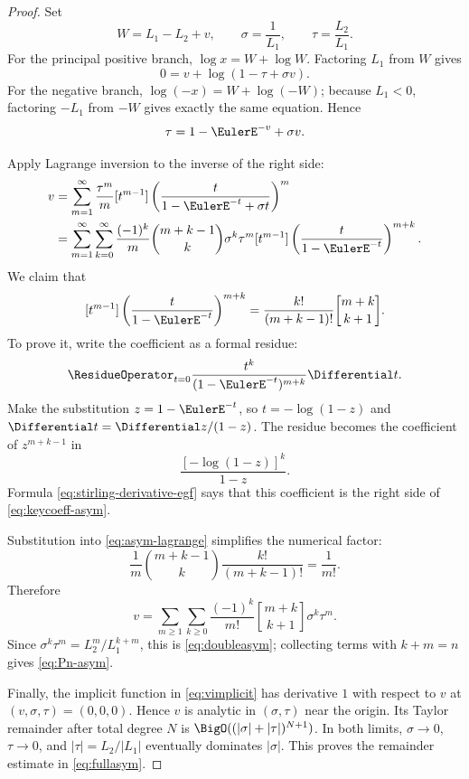 \documentclass[11pt]{article}
\theoremstyle{remark}
\newcommand{\stirling}[2]{\genfrac{[}{]}{0pt}{}{#1}{#2}}
\begin{document}
\begin{proof}
Set
\[
       W=L_1-L_2+v,\qquad
       \sigma=\frac1{L_1},\qquad
       \tau=\frac{L_2}{L_1}.
\]
For the principal positive branch,
\(\log x=W+\log W\).  Factoring \(L_1\) from \(W\) gives
\[
 0=v+\log(1-\tau+\sigma v).
\]
For the negative branch, \(\log(-x)=W+\log(-W)\); because \(L_1<0\),
factoring \(-L_1\) from \(-W\) gives exactly the same equation.  Hence
\begin{equation}\label{eq:vimplicit}
       \tau=1-\EulerE^{-v}+\sigma v.
\end{equation}

Apply Lagrange inversion to the inverse of the right side:
\begin{align}
 v
 &=\sum_{m=1}^{\infty}\frac{\tau^m}{m}
 [t^{m-1}]
 \left(\frac{t}{1-\EulerE^{-t}+\sigma t}\right)^m\notag\\
 &=\sum_{m=1}^{\infty}\sum_{k=0}^{\infty}
 \frac{(-1)^k}{m}
 \binom{m+k-1}{k}\sigma^k\tau^m
 [t^{m-1}]
 \left(\frac{t}{1-\EulerE^{-t}}\right)^{m+k}.
 \label{eq:asym-lagrange}
\end{align}
We claim that
\begin{equation}\label{eq:keycoeff-asym}
 [t^{m-1}]
 \left(\frac{t}{1-\EulerE^{-t}}\right)^{m+k}
 =\frac{k!}{(m+k-1)!}\stirling{m+k}{k+1}.
\end{equation}
To prove it, write the coefficient as a formal residue:
\[
 \ResidueOperator_{t=0}\frac{t^k}{(1-\EulerE^{-t})^{m+k}}\Differential t.
\]
Make the substitution \(z=1-\EulerE^{-t}\), so
\(t=-\log(1-z)\) and \(\Differential t=\Differential z/(1-z)\).  The residue becomes the
coefficient of \(z^{m+k-1}\) in
\[
       \frac{[-\log(1-z)]^k}{1-z}.
\]
Formula \eqref{eq:stirling-derivative-egf} says that this coefficient is the
right side of \eqref{eq:keycoeff-asym}.

Substitution into \eqref{eq:asym-lagrange} simplifies the numerical factor:
\[
 \frac1m\binom{m+k-1}{k}\frac{k!}{(m+k-1)!}
 =\frac1{m!}.
\]
Therefore
\[
 v=\sum_{m\geq1}\sum_{k\geq0}
 \frac{(-1)^k}{m!}\stirling{m+k}{k+1}
 \sigma^k\tau^m.
\]
Since \(\sigma^k\tau^m=L_2^m/L_1^{k+m}\), this is
\eqref{eq:doubleasym}; collecting terms with \(k+m=n\) gives
\eqref{eq:Pn-asym}.

Finally, the implicit function in \eqref{eq:vimplicit} has derivative \(1\)
with respect to \(v\) at \((v,\sigma,\tau)=(0,0,0)\).  Hence \(v\) is
analytic in \((\sigma,\tau)\) near the origin.  Its Taylor remainder after
total degree \(N\) is
\(\BigO((|\sigma|+|\tau|)^{N+1})\).  In both limits,
\(\sigma\to0\), \(\tau\to0\), and
\(|\tau|=L_2/|L_1|\) eventually dominates \(|\sigma|\).  This proves the
remainder estimate in \eqref{eq:fullasym}.
\end{proof}
\end{document}
